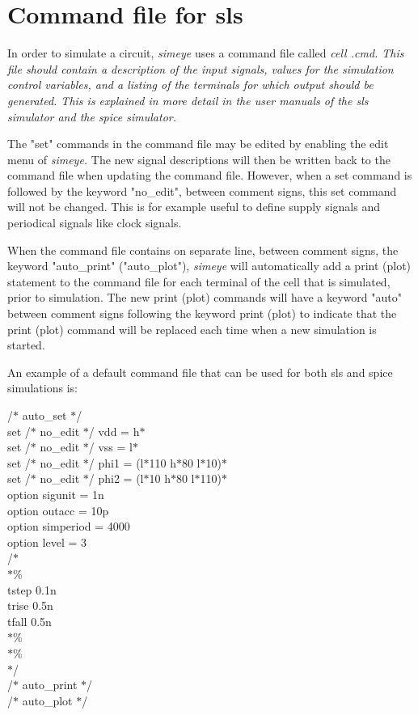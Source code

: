 \section{Command file for sls}
In order to simulate a circuit,
{\it simeye}
uses a command file called %
\it cell\rm%
.cmd.
This file should contain a description
of the input signals, values for the simulation control variables,
and a listing of the terminals for which output should be generated.
This is explained in more detail in the user manuals of
the sls simulator and the spice simulator.
\par
The "set" commands in the command file
may be edited by enabling the edit menu of
{\it simeye.}
The new signal descriptions will then be written back
to the command file when updating
the command file.
However, when a set command is followed by the keyword "no\_edit",
between comment signs,
this set command will not be changed.
This is for example useful to define supply signals and
periodical signals like clock signals.
\par
When the command file contains on separate line,
between comment signs, the keyword "auto\_print"
("auto\_plot"),
{\it simeye}
will automatically add a print (plot) statement to the
command file for each terminal of the cell that is simulated, 
prior to simulation.
The new print (plot) commands will have a keyword "auto" between
comment signs following the keyword print (plot) to indicate
that the print (plot) command will be replaced each time
when a new simulation is started.
\par
An example of a default command file that can be used for
both sls and spice simulations is:
\par
/$\ast$ auto\_set $\ast$/\\
set /$\ast$ no\_edit $\ast$/ vdd = h$\ast$\~\\
set /$\ast$ no\_edit $\ast$/ vss = l$\ast$\~\\
set /$\ast$ no\_edit $\ast$/ phi1 = (l$\ast$110 h$\ast$80 l$\ast$10)$\ast$\~\\
set /$\ast$ no\_edit $\ast$/ phi2 = (l$\ast$10 h$\ast$80 l$\ast$110)$\ast$\~\\
option sigunit = 1n\\
option outacc = 10p\\
option simperiod = 4000\\
option level = 3\\
/$\ast$\\
$\ast$\%\\
tstep 0.1n\\
trise 0.5n\\
tfall 0.5n\\
$\ast$\%\\
$\ast$\%\\
$\ast$/\\
/$\ast$ auto\_print $\ast$/\\
/$\ast$ auto\_plot $\ast$/\\
